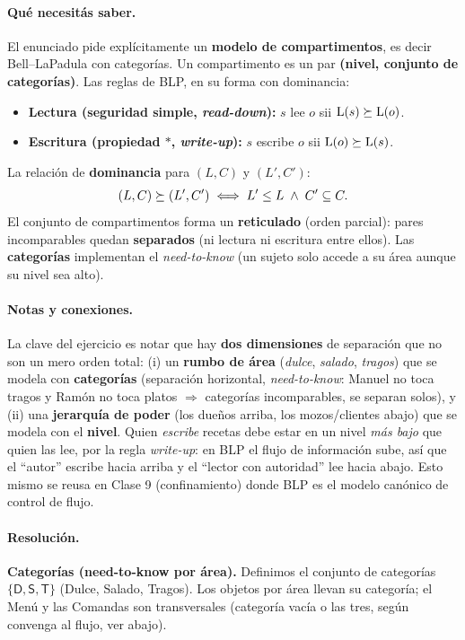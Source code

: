 \paragraph{Qué necesitás saber.}
El enunciado pide explícitamente un \textbf{modelo de compartimentos}, es decir
Bell--LaPadula con categorías. Un compartimento es un par \textbf{(nivel, conjunto de
categorías)}. Las reglas de BLP, en su forma con dominancia:
\begin{itemize}
  \item \textbf{Lectura (seguridad simple, \emph{read-down}):} $s$ lee $o$ sii
        $\mathrm{L}(s) \succeq \mathrm{L}(o)$.
  \item \textbf{Escritura (propiedad $\ast$, \emph{write-up}):} $s$ escribe $o$ sii
        $\mathrm{L}(o) \succeq \mathrm{L}(s)$.
\end{itemize}
La relación de \textbf{dominancia} para $(L,C)$ y $(L',C')$:
\begin{equation*}
  (L,C) \succeq (L',C') \iff L' \le L \;\wedge\; C' \subseteq C.
\end{equation*}
El conjunto de compartimentos forma un \textbf{reticulado} (orden parcial): pares incomparables
quedan \textbf{separados} (ni lectura ni escritura entre ellos). Las \textbf{categorías}
implementan el \emph{need-to-know} (un sujeto solo accede a su área aunque su nivel sea alto).

\paragraph{Notas y conexiones.}
La clave del ejercicio es notar que hay \textbf{dos dimensiones} de separación que no son un
mero orden total: (i) un \textbf{rumbo de área} (\emph{dulce}, \emph{salado}, \emph{tragos})
que se modela con \textbf{categorías} (separación horizontal, \emph{need-to-know}: Manuel no
toca tragos y Ramón no toca platos $\Rightarrow$ categorías incomparables, se separan solos),
y (ii) una \textbf{jerarquía de poder} (los dueños arriba, los mozos/clientes abajo) que se
modela con el \textbf{nivel}. Quien \emph{escribe} recetas debe estar en un nivel \emph{más
bajo} que quien las lee, por la regla \emph{write-up}: en BLP el flujo de información sube, así
que el ``autor'' escribe hacia arriba y el ``lector con autoridad'' lee hacia abajo. Esto
mismo se reusa en Clase 9 (confinamiento) donde BLP es el modelo canónico de control de flujo.

\paragraph{Resolución.}
\textbf{Categorías (need-to-know por área).} Definimos el conjunto de categorías
$\{\textsf{D}, \textsf{S}, \textsf{T}\}$ (Dulce, Salado, Tragos). Los objetos por área llevan
su categoría; el \textsf{Menú} y las \textsf{Comandas} son transversales (categoría vacía o
las tres, según convenga al flujo, ver abajo).

